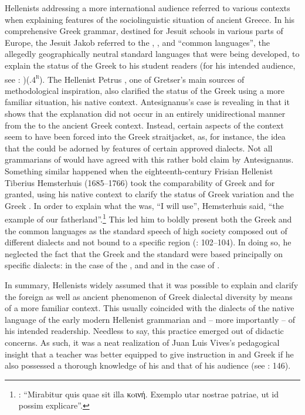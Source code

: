 Hellenists addressing a more international audience referred to various  contexts when explaining features of the sociolinguistic situation of ancient Greece. In his comprehensive Greek grammar, destined for Jesuit schools in various parts of Europe, the Jesuit Jakob \citet[20]{Gretser1593} referred to the , , and  “common languages”, the allegedly geographically neutral standard languages that were being developed, to explain the status of the Greek  to his student readers (for his intended audience, see \citealt{Gretser1593}: {\footnotesize{)(}}.4\textsc{\textsuperscript{r}}). The  Hellenist Petrus \citet[11--12]{Antesignanus1554}, one of Gretser’s main sources of methodological inspiration, also clarified the status of the Greek  using a more familiar situation, his native  context. Antesignanus’s case is revealing in that it shows that the explanation did not occur in an entirely unidirectional manner from the  to the ancient Greek context. Instead, certain aspects of the  context seem to have been forced into the Greek straitjacket, as, for instance, the idea that the   could be adorned by features of certain approved  dialects. Not all grammarians of  would have agreed with this rather bold claim by Antesignanus. Something similar happened when the eighteenth-century Frisian Hellenist Tiberius Hemsterhuis (1685–1766) took the comparability of Greek and  for granted, using his native context to clarify the status of Greek variation and the Greek . In order to explain what the  was, “I will use”, Hemsterhuis said, “the example of our fatherland”.\footnote{\citet[102]{Hemsterhuis2015}: “Mirabitur quis quae sit illa κoινή. Exemplo utar nostrae patriae, ut id possim explicare”.} This led him to boldly present both the Greek and the  common languages as the standard speech of high society composed out of different dialects and not bound to a specific region (\citealt{Hemsterhuis2015}: 102–104). In doing so, he neglected the fact that the Greek  and the  standard were based principally on specific dialects:  in the case of the , and  and  in the case of .

In summary, Hellenists widely assumed that it was possible to explain and clarify the foreign as well as ancient phenomenon of Greek dialectal diversity by means of a more familiar context. This usually coincided with the dialects of the native language of the early modern Hellenist grammarian and – more importantly – of his intended readership. Needless to say, this practice emerged out of didactic concerns. As such, it was a neat realization of Juan Luis Vives’s pedagogical insight that a teacher was better equipped to give instruction in  and Greek if he also possessed a thorough knowledge of his  and that of his audience (see \citealt{Padley1985}: 146).

